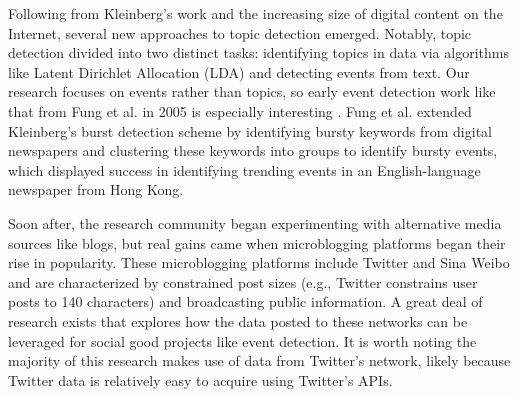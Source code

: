 \documentclass{sig-alternate}
\begin{document}
Following from Kleinberg's work and the increasing size of digital content on the Internet, several new approaches to topic detection emerged.
Notably, topic detection divided into two distinct tasks: identifying topics in data via algorithms like Latent Dirichlet Allocation (LDA) \cite{blei2003latent} and detecting events from text.
Our research focuses on events rather than topics, so early event detection work like that from Fung et al. in 2005 is especially interesting \cite{Fung:2005:PFB:1083592.1083616}.
Fung et al. extended Kleinberg's burst detection scheme by identifying bursty keywords from digital newspapers and clustering these keywords into groups to identify bursty events, which displayed success in identifying trending events in an English-language newspaper from Hong Kong.



Soon after, the research community began experimenting with alternative media sources like blogs, but real gains came when microblogging platforms began their rise in popularity.
These microblogging platforms include Twitter and Sina Weibo and are characterized by constrained post sizes (e.g., Twitter constrains user posts to 140 characters) and broadcasting public information.
A great deal of research exists that explores how the data posted to these networks can be leveraged for social good projects like event detection.
It is worth noting the majority of this research makes use of data from Twitter's network, likely because Twitter data is relatively easy to acquire using Twitter's APIs.
\end{document}
